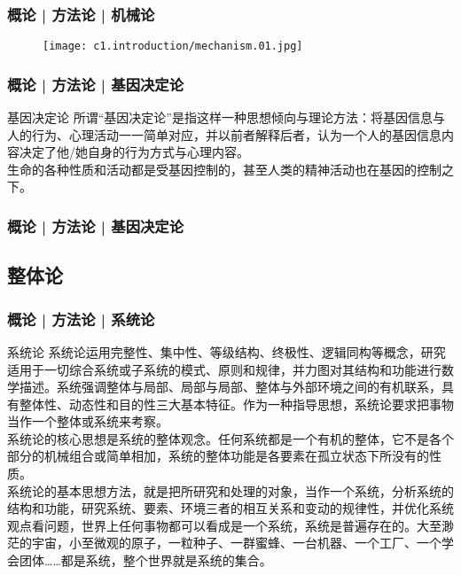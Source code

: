 \begin{frame}
  \frametitle{概论 | 方法论 | 机械论}
  \begin{figure}
    \centering
    \texttt{[image: c1.introduction/mechanism.01.jpg]}
  \end{figure}
\end{frame}

\begin{frame}
  \frametitle{概论 | 方法论 | 基因决定论}
  \begin{block}{基因决定论}
所谓“基因决定论”是指这样一种思想倾向与理论方法：将基因信息与人的行为、心理活动一一简单对应，并以前者解释后者，认为一个人的基因信息内容决定了他/她自身的行为方式与心理内容。\\
\vspace{1em}
  生命的各种性质和活动都是受基因控制的，甚至人类的精神活动也在基因的控制之下。
  \end{block}
\end{frame}

\begin{frame}
  \frametitle{概论 | 方法论 | 基因决定论}
  \begin{figure}
    \centering
    \qquad
  \end{figure}
\end{frame}

\subsection{整体论}
\begin{frame}
  \frametitle{概论 | 方法论 | 系统论}
  \begin{block}{系统论}
系统论运用完整性、集中性、等级结构、终极性、逻辑同构等概念，研究适用于一切综合系统或子系统的模式、原则和规律，并力图对其结构和功能进行数学描述。系统强调整体与局部、局部与局部、整体与外部环境之间的有机联系，具有整体性、动态性和目的性三大基本特征。作为一种指导思想，系统论要求把事物当作一个整体或系统来考察。\\
\vspace{0.5em}
系统论的核心思想是系统的整体观念。任何系统都是一个有机的整体，它不是各个部分的机械组合或简单相加，系统的整体功能是各要素在孤立状态下所没有的性质。\\
\vspace{0.5em}
系统论的基本思想方法，就是把所研究和处理的对象，当作一个系统，分析系统的结构和功能，研究系统、要素、环境三者的相互关系和变动的规律性，并优化系统观点看问题，世界上任何事物都可以看成是一个系统，系统是普遍存在的。大至渺茫的宇宙，小至微观的原子，一粒种子、一群蜜蜂、一台机器、一个工厂、一个学会团体……都是系统，整个世界就是系统的集合。
  \end{block}
\end{frame}

